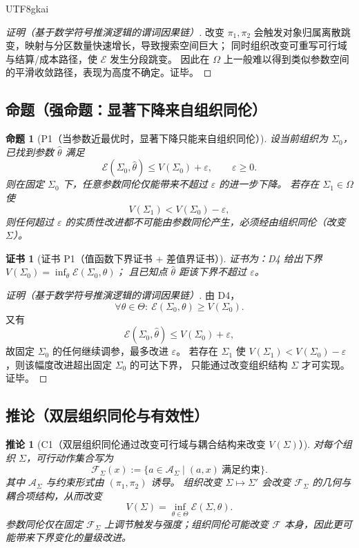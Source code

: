 \documentclass[12pt]{article}
\newtheorem{proposition}{命题}[section]
\newtheorem{corollary}{推论}[section]
\newtheorem{Certificate}{证书}[section]
\begin{document}
\begin{CJK*}{UTF8}{gkai}
\begin{proof}[证明（基于数学符号推演逻辑的谓词因果链）]
改变 $\pi_1,\pi_2$ 会触发对象归属离散跳变，映射与分区数量快速增长，导致搜索空间巨大；
同时组织改变可重写可行域与结算/成本路径，使 $\mathcal{E}$ 发生分段跳变。
因此在 $\Omega$ 上一般难以得到类似参数空间的平滑收敛路径，表现为高度不确定。证毕。
\end{proof}

\subsection{命题（强命题：显著下降来自组织同伦）}
\label{subsec:tex28-ch7-props}

\begin{proposition}[P1（当参数近最优时，显著下降只能来自组织同伦）]
\label{prop:tex28-ch7-p1}
设当前组织为 $\Sigma_0$，已找到参数 $\hat\theta$ 满足
\[
  \mathcal{E}(\Sigma_0,\hat\theta)\le V(\Sigma_0)+\varepsilon,
  \qquad \varepsilon\ge 0.
\]
则在固定 $\Sigma_0$ 下，任意参数同伦仅能带来不超过 $\varepsilon$ 的进一步下降。
若存在 $\Sigma_1\in\Omega$ 使
\[
  V(\Sigma_1)<V(\Sigma_0)-\varepsilon,
\]
则任何超过 $\varepsilon$ 的实质性改进都不可能由参数同伦产生，必须经由组织同伦（改变 $\Sigma$）。
\end{proposition}

\begin{Certificate}[证书 P1（值函数下界证书 + 差值界证书）]
\label{cert:tex28-ch7-p1}
证书为：D4 给出下界 $V(\Sigma_0)=\inf_{\theta}\mathcal{E}(\Sigma_0,\theta)$；
且已知点 $\hat\theta$ 距该下界不超过 $\varepsilon$。
\end{Certificate}

\begin{proof}[证明（基于数学符号推演逻辑的谓词因果链）]
由 D4，
\[
  \forall\theta\in\Theta:\ \mathcal{E}(\Sigma_0,\theta)\ge V(\Sigma_0).
\]
又有
\[
  \mathcal{E}(\Sigma_0,\hat\theta)\le V(\Sigma_0)+\varepsilon,
\]
故固定 $\Sigma_0$ 的任何继续调参，最多改进 $\varepsilon$。
若存在 $\Sigma_1$ 使 $V(\Sigma_1)<V(\Sigma_0)-\varepsilon$，则该幅度改进超出固定 $\Sigma_0$ 的可达下界，
只能通过改变组织结构 $\Sigma$ 才可实现。证毕。
\end{proof}

\subsection{推论（双层组织同伦与有效性）}
\label{subsec:tex28-ch7-corollaries}

\begin{corollary}[C1（双层组织同伦通过改变可行域与耦合结构来改变 $V(\Sigma)$）]
\label{cor:tex28-ch7-c1}
对每个组织 $\Sigma$，可行动作集合写为
\[
  \mathcal{F}_{\Sigma}(x):=\{a\in\mathcal{A}_{\Sigma}\mid (a,x)\ \text{满足约束}\}.
\]
其中 $\mathcal{A}_{\Sigma}$ 与约束形式由 $(\pi_1,\pi_2)$ 诱导。
组织改变 $\Sigma\mapsto\Sigma'$ 会改变 $\mathcal{F}_{\Sigma}$ 的几何与耦合项结构，从而改变
\[
  V(\Sigma)=\inf_{\theta\in\Theta}\mathcal{E}(\Sigma,\theta).
\]
参数同伦仅在固定 $\mathcal{F}_{\Sigma}$ 上调节触发与强度；组织同伦可能改变 $\mathcal{F}$ 本身，因此更可能带来下界变化的量级改进。
\end{corollary}


\end{CJK*}
\end{document}

